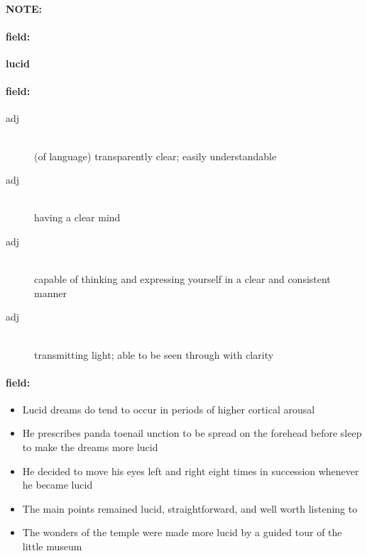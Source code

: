\documentclass[12pt]{article}
\newenvironment{note}{\paragraph{NOTE:}}{}
\newenvironment{field}{\paragraph{field:}}{}
\begin{document}
\begin{note}
\begin{field}
\textbf{\large lucid}
\end{field}


\begin{field}
\begin{description}
\item[adj] \hfill \\ 
(of language) transparently clear; easily understandable

\item[adj] \hfill \\ 
having a clear mind

\item[adj] \hfill \\ 
capable of thinking and expressing yourself in a clear and consistent manner

\item[adj] \hfill \\ 
transmitting light; able to be seen through with clarity

\end{description}
\end{field}

\begin{field}
\begin{itemize}
\item Lucid dreams do tend to occur in periods of higher cortical arousal
\item He prescribes panda toenail unction to be spread on the forehead before sleep to make the dreams more lucid
\item He decided to move his eyes left and right eight times in succession whenever he became lucid
\item The main points remained lucid, straightforward, and well worth listening to
\item The wonders of the temple were made more lucid by a guided tour of the little museum
\end{itemize}
\end{field}
\end{note}
\end{document}
